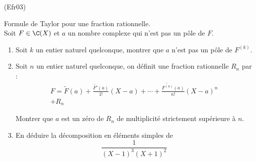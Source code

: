 \begin{tiny}(Efr03)\end{tiny} Formule de Taylor pour une fraction rationnelle.\\
Soit $F\in \C(X)$ et $a$ un nombre complexe qui n'est pas un pôle de $F$.
\begin{enumerate}
 \item  Soit $k$ un entier naturel quelconque, montrer que $a$ n'est pas un pôle de $F^{(k)}$.
\item Soit $n$ un entier naturel quelconque, on définit une fraction rationnelle $R_n$ par :
\begin{multline*}
 F = \widetilde{F}(a)+\frac{\widetilde{F'}(a)}{1!}(X-a)+\cdots
+ \frac{\widetilde{F^{(n)}}(a)}{n!}(X-a)^n \\ + R_n
\end{multline*}

Montrer que $a$ est un zéro de $R_n$ de multiplicité strictement supérieure à $n$.
\item En déduire la décomposition en éléments simples de 
\begin{displaymath}
 \frac{1}{(X-1)^3(X+1)^2}
\end{displaymath}
\end{enumerate}
